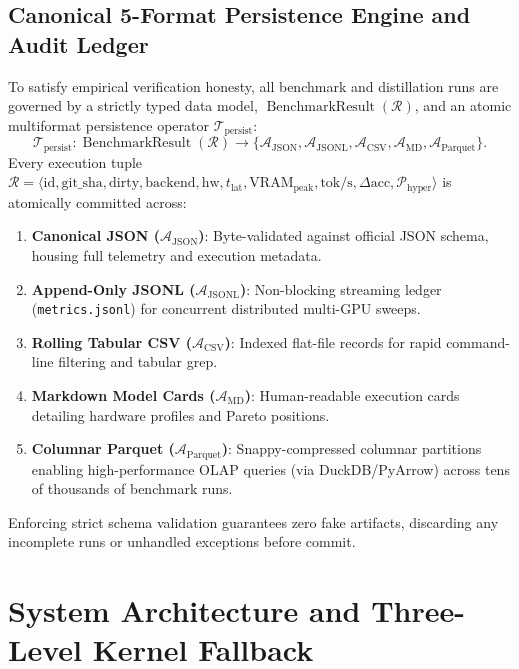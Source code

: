\documentclass{article}
\begin{document}
\subsection{Canonical 5-Format Persistence Engine and Audit Ledger}
\label{subsec:math_persistence_engine}
To satisfy empirical verification honesty, all benchmark and distillation runs are governed by a strictly typed data model, $\operatorname{BenchmarkResult}(\mathcal{R})$, and an atomic multiformat persistence operator $\mathcal{T}_{\text{persist}}$:
\begin{equation}
    \mathcal{T}_{\text{persist}}: \operatorname{BenchmarkResult}(\mathcal{R}) \longrightarrow \{\mathcal{A}_{\text{JSON}}, \mathcal{A}_{\text{JSONL}}, \mathcal{A}_{\text{CSV}}, \mathcal{A}_{\text{MD}}, \mathcal{A}_{\text{Parquet}}\}.
\end{equation}
Every execution tuple $\mathcal{R} = \langle \text{id}, \text{git\_sha}, \text{dirty}, \text{backend}, \text{hw}, t_{\text{lat}}, \text{VRAM}_{\text{peak}}, \text{tok/s}, \Delta \text{acc}, \mathcal{P}_{\text{hyper}} \rangle$ is atomically committed across:
\begin{enumerate}
    \item \textbf{Canonical JSON ($\mathcal{A}_{\text{JSON}}$)}: Byte-validated against official JSON schema, housing full telemetry and execution metadata.
    \item \textbf{Append-Only JSONL ($\mathcal{A}_{\text{JSONL}}$)}: Non-blocking streaming ledger (\texttt{metrics.jsonl}) for concurrent distributed multi-GPU sweeps.
    \item \textbf{Rolling Tabular CSV ($\mathcal{A}_{\text{CSV}}$)}: Indexed flat-file records for rapid command-line filtering and tabular grep.
    \item \textbf{Markdown Model Cards ($\mathcal{A}_{\text{MD}}$)}: Human-readable execution cards detailing hardware profiles and Pareto positions.
    \item \textbf{Columnar Parquet ($\mathcal{A}_{\text{Parquet}}$)}: Snappy-compressed columnar partitions enabling high-performance OLAP queries (via DuckDB/PyArrow) across tens of thousands of benchmark runs.
\end{enumerate}
Enforcing strict schema validation guarantees zero fake artifacts, discarding any incomplete runs or unhandled exceptions before commit.

\section{System Architecture and Three-Level Kernel Fallback}
\label{sec:system_arch}
\end{document}

